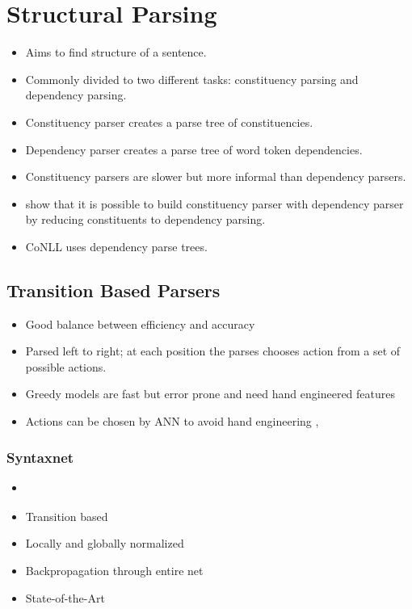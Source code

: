 \documentclass[12pt,a4paper,english
]{tutthesis}
\begin{document}
\section{Structural Parsing}
\label{se:structural_parsing}
\begin{itemize}
\item Aims to find structure of a sentence.
\item Commonly divided to two different tasks: constituency parsing and dependency parsing.
\item Constituency parser creates a parse tree of constituencies.
\item Dependency parser creates a parse tree of word token dependencies.
\item Constituency parsers are slower but more informal than dependency parsers. \cite{Fernandez-Gonzalez2015}
\item \cite{Fernandez-Gonzalez2015} show that it is possible to build constituency parser with dependency parser by reducing constituents to dependency parsing.
\item CoNLL uses dependency parse trees.
\end{itemize}

\subsection{Transition Based Parsers}
\begin{itemize}
\item Good balance between efficiency and accuracy \cite{Weiss2015}
\item Parsed left to right; at each position the parses chooses action from a set of possible actions.
\item Greedy models are fast but error prone and need hand engineered features \cite{Weiss2015}
\item Actions can be chosen by ANN to avoid hand engineering \cite{Chen2014}, \cite{Weiss2015}
\end{itemize}

\subsubsection{Syntaxnet}
\begin{itemize}
\item \cite{Andor2016}
\item Transition based
\item Locally and globally normalized
\item Backpropagation through entire net
\item State-of-the-Art
\end{itemize}
\end{document}
